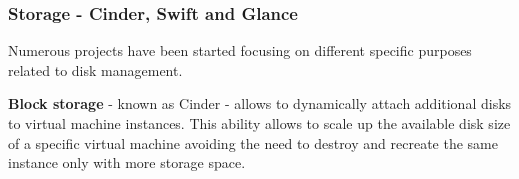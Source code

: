 \subsubsection{Storage - Cinder, Swift and Glance}
\label{sec:openstack_storage}
Numerous projects have been started focusing on different specific purposes related to disk management.

\textbf{Block storage} - known as Cinder - allows to dynamically attach additional disks to virtual machine instances. This ability allows to scale up the available disk size of a specific virtual machine avoiding the need to destroy and recreate the same instance only with more storage space.

